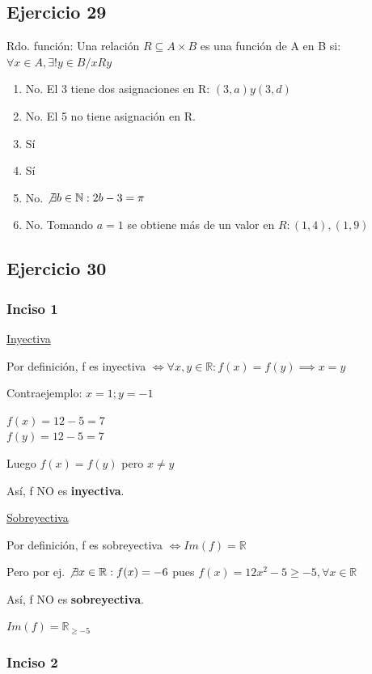 \subsection{Ejercicio 29}
Rdo. función: Una relación $R \subseteq A\times B$ es una función de A en B si: $\forall x \in A, \exists ! y \in B / xRy$

\begin{enumerate}[label=(\alph*)]
    \item No. El 3 tiene dos asignaciones en R: $(3,a) y (3,d)$
    \item No. El 5 no tiene asignación en R.
    \item Sí
    \item Sí
    \item No. $\not \exists b \in \mathbb{N}: 2b-3 = \pi$
    \item No. Tomando $a = 1$ se obtiene más de un valor en $R: (1,4), (1,9)$
\end{enumerate}

\subsection{Ejercicio 30}

\subsubsection{Inciso 1}

\underline{Inyectiva}

Por definición, f es inyectiva $\iff \forall x, y \in \mathbb{R}: f(x) = f(y) \implies x = y$

Contraejemplo: $x = 1; y=-1$

$f(x) = 12-5 = 7$\\
$f(y) = 12-5 = 7$

Luego $f(x) = f(y)$ pero $x \neq y$

Así, f NO es \textbf{inyectiva}.

\underline{Sobreyectiva}

Por definición, f es sobreyectiva $\iff Im(f) = \mathbb{R}$

Pero por ej. $\not \exists x \in \mathbb{R}: f(x) = -6$ pues $f(x) = 12x^2 -5 \geq -5, \forall x \in \mathbb{R}$

Así, f NO es \textbf{sobreyectiva}.

$Im(f) = \mathbb{R}_{\geq -5}$

\subsubsection{Inciso 2}

